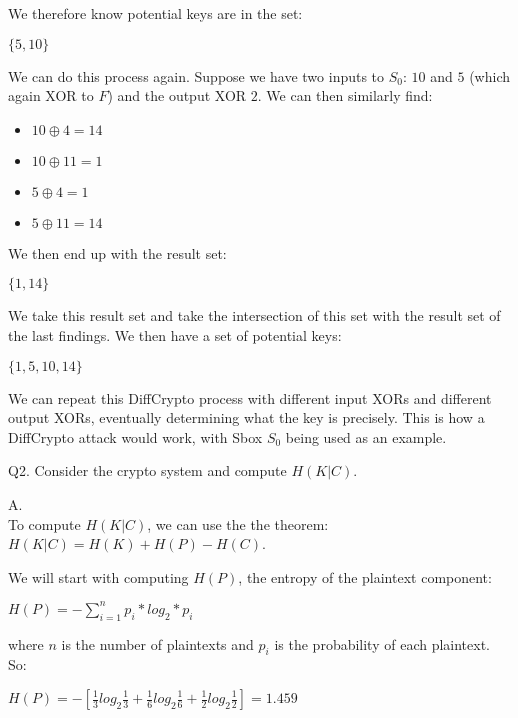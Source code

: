 \documentclass[11pt]{article}
\newcommand{\tab}{\hspace{10mm}}
\newcommand{\gap}{\vspace{5mm}}
\newcommand{\bigGap}{\vspace{10mm}}
\begin{document}
We therefore know potential keys are in the set:
\begin{center}
$\{5, 10\}$
\end{center}

We can do this process again. Suppose we have two inputs to $S_0$: $10$ and $5$ (which again XOR to $F$) and the output XOR $2$. We can then similarly find:

\begin{itemize}
\item $10 \oplus 4 = 14$
\item $10 \oplus 11 = 1$
\item $5 \oplus 4 = 1$
\item $5\oplus 11 = 14$
\end{itemize}

We then end up with the result set:
\begin{center}
$\{1, 14\}$
\end{center}

We take this result set and take the intersection of this set with the result set of the last findings. We then have a set of potential keys:

\begin{center}
$\{1, 5, 10, 14\}$
\end{center}

We can repeat this DiffCrypto process with different input XORs and different output XORs, eventually determining what the key is precisely. This is how a DiffCrypto attack would work, with Sbox $S_0$ being used as an example.

\bigGap{}

Q2. Consider the crypto system and compute $H(K|C)$.

\gap{}

A. \\
\tab To compute $H(K|C)$, we can use the the theorem: $H(K|C) = H(K) + H(P) - H(C)$.

We will start with computing $H(P)$, the entropy of the plaintext component:

\begin{center}
$H(P) = - \sum_{i=1}^{n} p_i * log_2 * p_i $
\end{center}
where $n$ is the number of plaintexts and $p_i$ is the probability of each plaintext. So:
\begin{center}
$H(P) = -[\frac{1}{3} log_2 \frac{1}{3} + \frac{1}{6} log_2 \frac{1}{6} + \frac{1}{2} log_2 \frac{1}{2}] = 1.459$
\end{center}
\end{document}
